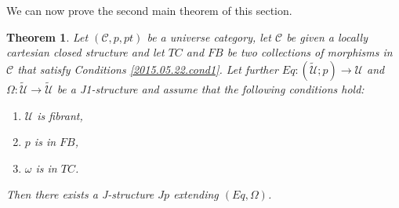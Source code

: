\documentclass[12pt]{article}
\numberwithin{equation}{section}
\newtheorem{theorem}[proposition]{Theorem}
\newcommand{\llabel}[1]{\label{#1}}
\newcommand{\sr}{\rightarrow}
\newcommand{\wt}{\widetilde}
\newcommand{\U}{\mathcal{U}}
\begin{document}
%















We can now prove the second main theorem of this section.
%
\begin{theorem}
\llabel{2015.05.16.th1} Let $({\mathcal C},p,pt)$ be a universe category, let
$\mathcal C$ be given a locally cartesian closed structure and let $TC$ and
$FB$ be two collections of morphisms in $\mathcal C$ that satisfy Conditions
\ref{2015.05.22.cond1}. Let further $Eq:(\wt{\U};p)\sr \U$ and $\Omega:\wt{\U}\sr
\wt{\U}$ be a J1-structure and assume that the following conditions hold:
%
\begin{enumerate}
\item $\U$ is fibrant,
\item $p$ is in $FB$,
\item $\omega$ is in $TC$.
\end{enumerate}
%
Then there exists a J-structure $Jp$ extending $(Eq,\Omega)$.
\end{theorem}
%
\end{document}
